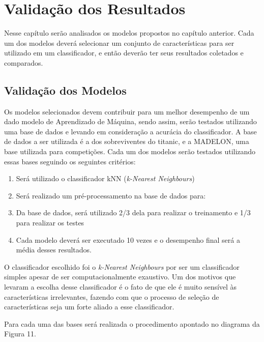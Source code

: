 \chapter[Validação dos Resultados]{Validação dos Resultados}
\label{ch:validacao}

Nesse capítulo serão analisados os modelos propostos no capítulo anterior. Cada um dos modelos deverá selecionar um conjunto de características para ser utilizado em um classificador, e então deverão ter seus resultados coletados e comparados. 


\section{Validação dos Modelos}

Os modelos selecionados devem contribuir para um melhor desempenho de um dado modelo de Aprendizado de Máquina, sendo assim, serão testados utilizando uma base de dados e levando em consideração a acurácia do classificador. A base de dados a ser utilizada é a dos sobreviventes do titanic, e a MADELON, uma base utilizada para competições. Cada um dos modelos serão testados utilizando essas bases seguindo os seguintes critérios:

\begin{enumerate}
	\item{Será utilizado o classificador kNN (\textit{k-Nearest Neighbours})}
	\item{Será realizado um pré-processamento na base de dados para:}
	\item{Da base de dados, será utilizado 2/3 dela para realizar o treinamento e 1/3 para realizar os testes}
	\item{Cada modelo deverá ser executado 10 vezes e o desempenho final será a média desses resultados.}
\end{enumerate}

O classificador escolhido foi o \textit{k-Nearest Neighbours} por ser um classificador simples apesar de ser computacionalmente exaustivo. Um dos motivos que levaram a escolha desse classificador é o fato de que ele é muito sensível às características irrelevantes, fazendo com que o processo de seleção de características seja um forte aliado a esse classificador.

Para cada uma das bases será realizada o procedimento apontado no diagrama da Figura 11.


